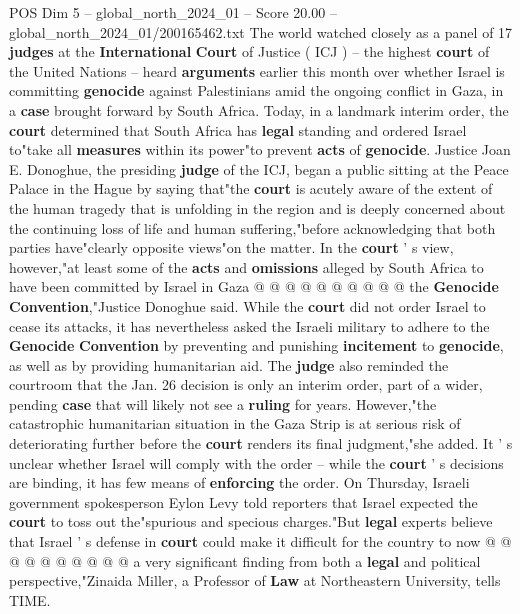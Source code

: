 \begin{textsample}{POS Dim 5 – global\_north\_2024\_01 – Score 20.00 – global\_north\_2024\_01/200165462.txt}  \label{ex:f5_pos_114}
The world watched closely as a panel of 17 \textbf{judges} at the \textbf{International} \textbf{Court} of Justice ( ICJ ) -- the highest \textbf{court} of the United Nations -- heard \textbf{arguments} earlier this month over whether Israel is committing \textbf{genocide} against Palestinians amid the ongoing conflict in Gaza, in a \textbf{case} brought forward by South Africa.
Today, in a landmark interim order, the \textbf{court} determined that South Africa has \textbf{legal} standing and ordered Israel to"take all \textbf{measures} within its power"to prevent \textbf{acts} of \textbf{genocide}.
Justice Joan E.
Donoghue, the presiding \textbf{judge} of the ICJ, began a public sitting at the Peace Palace in the Hague by saying that"the \textbf{court} is acutely aware of the extent of the human tragedy that is unfolding in the region and is deeply concerned about the continuing loss of life and human suffering,"before acknowledging that both parties have"clearly opposite views"on the matter.
In the \textbf{court} ' s view, however,"at least some of the \textbf{acts} and \textbf{omissions} alleged by South Africa to have been committed by Israel in Gaza @ @ @ @ @ @ @ @ @ @ the \textbf{Genocide} \textbf{Convention},"Justice Donoghue said.
While the \textbf{court} did not order Israel to cease its attacks, it has nevertheless asked the Israeli military to adhere to the \textbf{Genocide} \textbf{Convention} by preventing and punishing \textbf{incitement} to \textbf{genocide}, as well as by providing humanitarian aid.
The \textbf{judge} also reminded the courtroom that the Jan. 26 decision is only an interim order, part of a wider, pending \textbf{case} that will likely not see a \textbf{ruling} for years.
However,"the catastrophic humanitarian situation in the Gaza Strip is at serious risk of deteriorating further before the \textbf{court} renders its final judgment,"she added.
It ' s unclear whether Israel will comply with the order -- while the \textbf{court} ' s decisions are binding, it has few means of \textbf{enforcing} the order.
On Thursday, Israeli government spokesperson Eylon Levy told reporters that Israel expected the \textbf{court} to toss out the"spurious and specious charges."But \textbf{legal} experts believe that Israel ' s defense in \textbf{court} could make it difficult for the country to now @ @ @ @ @ @ @ @ @ @ a very significant finding from both a \textbf{legal} and political perspective,"Zinaida Miller, a Professor of \textbf{Law} at Northeastern University, tells TIME.

\end{textsample}
